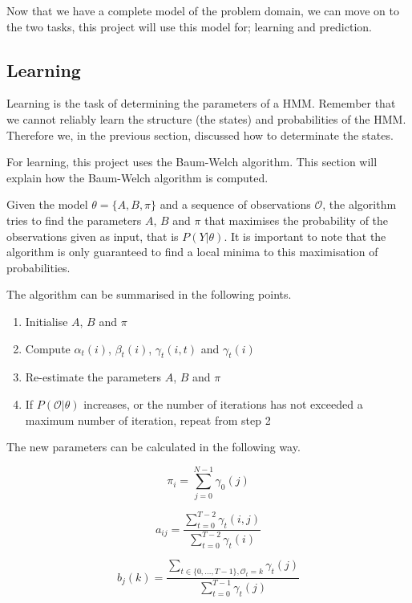 Now that we have a complete model of the problem domain, we can move on to the two tasks, this project will use this model for; learning and prediction.

\subsection{Learning}
Learning is the task of determining the parameters of a HMM. Remember that we cannot reliably learn the structure (the states) and probabilities of the HMM. Therefore we, in the previous section, discussed how to determinate the states.

For learning, this project uses the Baum-Welch algorithm\cite{hmmIntroduction}. This section will explain how the Baum-Welch algorithm is computed.

Given the model $\theta = \{A, B, \pi\}$ and a sequence of observations $\mathcal{O}$, the algorithm tries to find the parameters $A$, $B$ and $\pi$ that maximises the probability of the observations given as input, that is $P(Y | \theta)$. It is important to note that the algorithm is only guaranteed to find a local minima to this maximisation of probabilities.

The algorithm can be summarised in the following points\cite{hmmIntroduction}.

\begin{enumerate}
\item Initialise $A$, $B$ and $\pi$
\item Compute $\alpha_t(i)$, $\beta_t(i)$, $\gamma_t(i,t)$ and $\gamma_t(i)$
\item Re-estimate the parameters $A$, $B$ and $\pi$
\item If $P(\mathcal{O} | \theta)$ increases, or the number of iterations has not exceeded a maximum number of iteration, repeat from step 2
\end{enumerate}

The new parameters can be calculated in the following way\cite{hmmIntroduction}.

\begin{equation*}
\pi_i = \sum\limits_{j=0}^{N-1} \gamma_0(j)
\end{equation*}

\begin{equation*}
a_{ij} = \frac{\sum\limits_{t=0}^{T-2} \gamma_t(i, j)}{ \sum\limits_{t=0}^{T-2} \gamma_t(i) }
\end{equation*}

\begin{equation*}
b_j(k) = \frac{ \sum\limits_{t \in \{0,\ldots, T-1\}, \mathcal{O}_t = k} \gamma_t(j) } { \sum\limits_{t=0}^{T-1} \gamma_t(j) }
\end{equation*}

